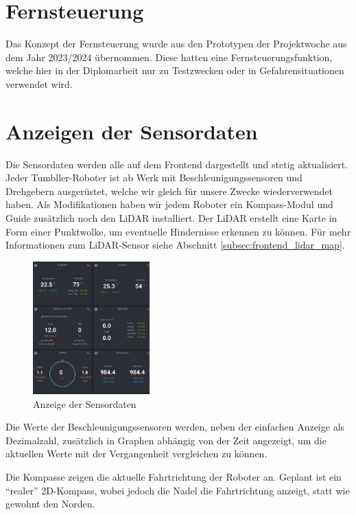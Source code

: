 \section{Fernsteuerung}
\label{subsec:frontend_control}
Das Konzept der Fernsteuerung wurde aus den Prototypen der Projektwoche aus dem Jahr 2023/2024 übernommen.
%
Diese hatten eine Fernsteuerungsfunktion,
welche hier in der Diplomarbeit nur zu Testzwecken oder in Gefahrensituationen verwendet wird.  

\section{Anzeigen der Sensordaten}
\label{subsec:frontend_sensors}
Die Sensordaten werden alle auf dem Frontend dargestellt und stetig aktualisiert.
%
Jeder Tumbller-Roboter ist ab Werk mit Beschleunigungssensoren und Drehgebern ausgerüstet,
welche wir gleich für unsere Zwecke wiederverwendet haben.
%
Als Modifikationen haben wir jedem Roboter ein Kompass-Modul
und Guide zusätzlich noch den LiDAR installiert.
%
Der LiDAR erstellt eine Karte in Form einer Punktwolke,
um eventuelle Hindernisse erkennen zu können.
%
Für mehr Informationen zum LiDAR-Sensor siehe Abschnitt \ref{subsec:frontend_lidar_map}.

\begin{figure}[H]
    \includegraphics[width=0.4\textwidth, center]{img/Sensor_Anzeige_LOESCHEN.png}
    \caption{Anzeige der Sensordaten}
    \label{fig:Sensordaten}
\end{figure}

Die Werte der Beschleunigungssensoren werden,
neben der einfachen Anzeige als Dezimalzahl,
zusätzlich in Graphen abhängig von der Zeit angezeigt,
um die aktuellen Werte mit der Vergangenheit vergleichen zu können.

Die Kompasse zeigen die aktuelle Fahrtrichtung der Roboter an.
Geplant ist ein ``realer'' 2D-Kompass,
wobei jedoch die Nadel die Fahrtrichtung anzeigt,
statt wie gewohnt den Norden.